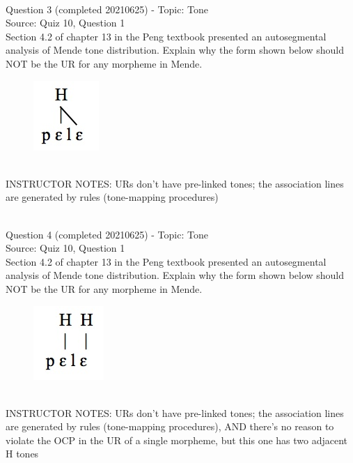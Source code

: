 \documentclass[12pt]{article}
\begin{document}
~\\

{\large Question 3} (completed 20210625) - Topic: Tone\\
Source: Quiz 10, Question 1\\

Section 4.2 of chapter 13 in the Peng textbook presented an autosegmental analysis of Mende tone distribution. Explain why the form shown below should NOT be the UR for any morpheme in Mende.\\

\begin{figure}[H]
\includegraphics{../images/mende_house_d.png}
\end{figure}

~\\
INSTRUCTOR NOTES: URs don't have pre-linked tones; the association lines are generated by rules (tone-mapping procedures)


~\\

{\large Question 4} (completed 20210625) - Topic: Tone\\
Source: Quiz 10, Question 1\\

Section 4.2 of chapter 13 in the Peng textbook presented an autosegmental analysis of Mende tone distribution. Explain why the form shown below should NOT be the UR for any morpheme in Mende.\\

\begin{figure}[H]
\includegraphics{../images/mende_house_e.png}
\end{figure}

~\\
INSTRUCTOR NOTES: URs don't have pre-linked tones; the association lines are generated by rules (tone-mapping procedures), AND there's no reason to violate the OCP in the UR of a single morpheme, but this one has two adjacent H tones
\end{document}
